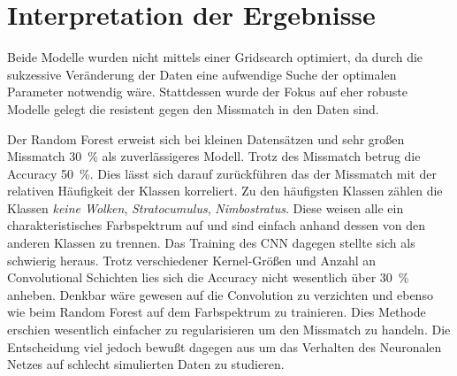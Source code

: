 \section{Interpretation der Ergebnisse}
\label{sec:04_dokumentation_interpretation_ergebnisse}

Beide Modelle wurden nicht mittels einer Gridsearch optimiert, da durch die
sukzessive Veränderung der Daten eine aufwendige Suche der optimalen Parameter
notwendig wäre.
Stattdessen wurde der Fokus auf eher robuste Modelle gelegt die 
resistent gegen den Missmatch in den Daten sind.

Der Random Forest erweist sich bei kleinen Datensätzen und sehr großen
Missmatch \SI{30}{\percent} als zuverlässigeres Modell.
Trotz des Missmatch betrug die Accuracy \SI{50}{\percent}. 
Dies lässt sich darauf zurückführen das der Missmatch mit der relativen
Häufigkeit der Klassen korreliert. 
Zu den häufigsten Klassen zählen die Klassen \textit{keine Wolken}, 
\textit{Stratocumulus}, \textit{Nimbostratus}. 
Diese weisen alle ein charakteristisches Farbspektrum auf und sind einfach
anhand dessen von den anderen Klassen zu trennen.
Das Training des CNN dagegen stellte sich als schwierig heraus. 
Trotz verschiedener Kernel-Größen und Anzahl an Convolutional Schichten lies
sich die Accuracy nicht wesentlich über \SI{30}{\percent} anheben. 
Denkbar wäre gewesen auf die Convolution zu verzichten und ebenso wie beim
Random Forest auf dem Farbspektrum zu trainieren.
Dies Methode erschien wesentlich einfacher zu regularisieren um den Missmatch
zu handeln.
Die Entscheidung viel jedoch bewußt dagegen aus um das Verhalten des Neuronalen Netzes
auf schlecht simulierten Daten zu studieren. 

